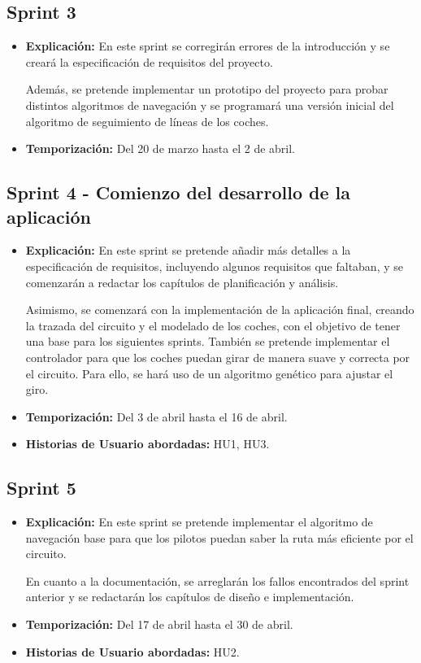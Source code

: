 \subsection{Sprint 3}
\begin{itemize}
    \item \textbf{Explicación:} En este sprint se corregirán errores de la introducción y se creará la especificación de requisitos del proyecto.
    
    Además, se pretende implementar un prototipo del proyecto para probar distintos algoritmos de navegación y se programará una versión inicial del algoritmo de seguimiento de líneas de los coches.
    \item \textbf{Temporización:} Del 20 de marzo hasta el 2 de abril.
\end{itemize}


\subsection{Sprint 4 - Comienzo del desarrollo de la aplicación}
\begin{itemize}
    \item \textbf{Explicación:} En este sprint se pretende añadir más detalles a la especificación de requisitos, incluyendo algunos requisitos que faltaban, y se comenzarán a redactar los capítulos de planificación y análisis.
    
    Asimismo, se comenzará con la implementación de la aplicación final, creando la trazada del circuito y el modelado de los coches, con el objetivo de tener una base para los siguientes sprints. También se pretende implementar el controlador para que los coches puedan girar de manera suave y correcta por el circuito. Para ello, se hará uso de un algoritmo genético para ajustar el giro.

    \item \textbf{Temporización:} Del 3 de abril hasta el 16 de abril.
    \item \textbf{Historias de Usuario abordadas:} HU1, HU3.
\end{itemize}

\subsection{Sprint 5}
\begin{itemize}
    \item \textbf{Explicación:} En este sprint se pretende implementar el algoritmo de navegación base para que los pilotos puedan saber la ruta más eficiente por el circuito.


    En cuanto a la documentación, se arreglarán los fallos encontrados del sprint anterior y se redactarán los capítulos de diseño e implementación.

    \item \textbf{Temporización:} Del 17 de abril hasta el 30 de abril.
    \item \textbf{Historias de Usuario abordadas:} HU2.
\end{itemize}


